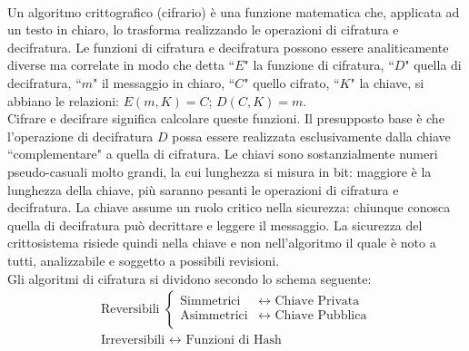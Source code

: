 \documentclass[a4paper,12pt]{tesiinfo}
\begin{document}
\\
Un algoritmo crittografico (cifrario) \`e una funzione matematica che, applicata ad un testo in chiaro, lo trasforma realizzando le operazioni di cifratura e decifratura. Le funzioni di cifratura e decifratura possono essere analiticamente diverse ma correlate in modo che detta ``$E$" la funzione di cifratura, ``$D$" quella di decifratura, ``$m$" il messaggio in chiaro, ``$C$" quello cifrato, ``$K$" la chiave, si abbiano le relazioni: $E(m, K) = C$; $D(C, K) = m$.
\\
Cifrare e decifrare significa calcolare queste funzioni. Il presupposto base \`e che l'operazione di decifratura $D$ possa essere realizzata esclusivamente dalla chiave ``complementare" a quella di cifratura. Le chiavi sono sostanzialmente numeri pseudo-casuali molto grandi, la cui lunghezza si misura in bit: maggiore \`e la lunghezza della chiave, pi\`u saranno pesanti le operazioni di cifratura e decifratura. La chiave assume un ruolo critico nella sicurezza: chiunque conosca quella di decifratura pu\`o decrittare e leggere il messaggio. La sicurezza del crittosistema risiede quindi nella chiave e non nell'algoritmo il quale \`e noto a tutti, analizzabile e soggetto a possibili revisioni.
\\
Gli algoritmi di cifratura si dividono secondo lo schema seguente:
\begin{align*} 
&\text{Reversibili } \begin{cases}
          \text{Simmetrici} & \longleftrightarrow \text{ Chiave Privata}\\
          \text{Asimmetrici} & \longleftrightarrow \text{ Chiave Pubblica}\\
        \end{cases}\\
&\text{Irreversibili } \longleftrightarrow \text{ Funzioni di Hash} &
\end{align*}
%
%
%
\end{document}
